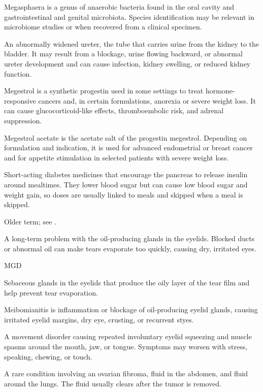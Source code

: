  Megasphaera is a genus of anaerobic bacteria found in the oral cavity and gastrointestinal and genital microbiota. Species identification may be relevant in microbiome studies or when recovered from a clinical specimen.

 An abnormally widened ureter, the tube that carries urine from the kidney to the bladder. It may result from a blockage, urine flowing backward, or abnormal ureter development and can cause infection, kidney swelling, or reduced kidney function.

 Megestrol is a synthetic progestin used in some settings to treat hormone-responsive cancers and, in certain formulations, anorexia or severe weight loss. It can cause glucocorticoid-like effects, thromboembolic risk, and adrenal suppression.

 Megestrol acetate is the acetate salt of the progestin megestrol. Depending on formulation and indication, it is used for advanced endometrial or breast cancer and for appetite stimulation in selected patients with severe weight loss.

 Short-acting diabetes medicines that encourage the pancreas to release insulin around mealtimes. They lower blood sugar but can cause low blood sugar and weight gain, so doses are usually linked to meals and skipped when a meal is skipped.

 Older term; see .

 A long-term problem with the oil-producing glands in the eyelids. Blocked ducts or abnormal oil can make tears evaporate too quickly, causing dry, irritated eyes.

\synonyms
MGD

 Sebaceous glands in the eyelids that produce the oily layer of the tear film and help prevent tear evaporation.

 Meibomianitis is inflammation or blockage of oil-producing eyelid glands, causing irritated eyelid margins, dry eye, crusting, or recurrent styes.

 A movement disorder causing repeated involuntary eyelid squeezing and muscle spasms around the mouth, jaw, or tongue. Symptoms may worsen with stress, speaking, chewing, or touch.

 A rare condition involving an ovarian fibroma, fluid in the abdomen, and fluid around the lungs. The fluid usually clears after the tumor is removed.

